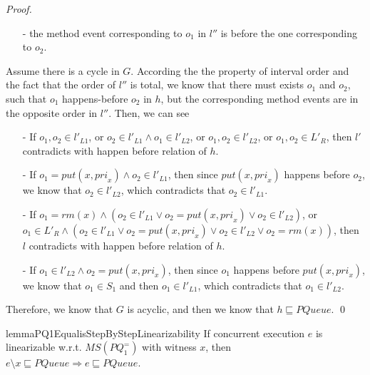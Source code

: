\begin {proof}
\begin{itemize}
\item[-] the method event corresponding to $o_1$ in $l''$ is before the one corresponding to $o_2$.
\end{itemize}

Assume there is a cycle in $G$. According the the property of interval order and the fact that the order of $l''$ is total, we know that there must exists $o_1$ and $o_2$, such that $o_1$ happens-before $o_2$ in $h$, but the corresponding method events are in the opposite order in $l''$. Then, we can see

\begin{itemize}
\setlength{\itemsep}{0.5pt}
\item[-] If $o_1,o_2 \in l'_{L1}$, or $o_2 \in l'_{L1} \wedge o_1 \in l'_{L2}$, or $o_1,o_2 \in l'_{L2}$, or $o_1,o_2 \in L'_R$, then $l'$ contradicts with happen before relation of $h$.

\item[-] If $o_1 = \textit{put}(x,\textit{pri}_x) \wedge o_2 \in l'_{L1}$, then since $\textit{put}(x,\textit{pri}_x)$ happens before $o_2$, we know that $o_2 \in l'_{L2}$, which contradicts that $o_2 \in l'_{L1}$.

\item[-] If $o_1 = \textit{rm}(x) \wedge (o_2 \in  l'_{L1} \vee o_2 = \textit{put}(x,\textit{pri}_x) \vee o_2 \in l'_{L2})$, or $o_1 \in L'_R \wedge ( o_2 \in l'_{L1} \vee o_2 = \textit{put}(x,\textit{pri}_x) \vee o_2 \in l'_{L2} \vee o_2 = \textit{rm}(x) )$, then $l$ contradicts with happen before relation of $h$.

\item[-] If $o_1 \in l'_{L2} \wedge o_2 = \textit{put}(x,\textit{pri}_x)$, then since $o_1$ happens before $\textit{put}(x,\textit{pri}_x)$, we know that $o_1 \in S_1$ and then $o_1 \in l'_{L1}$, which contradicts that $o_1 \in l'_{L2}$.
\end{itemize}

Therefore, we know that $G$ is acyclic, and then we know that $h \sqsubseteq \textit{PQueue}$. \qed
\end {proof}


\begin{restatable}{lemma}{PQ1EqualisStepByStepLinearizability}
\label{lemma:PQ1Equal is step-by-step linearizability}
If concurrent execution $e$ is linearizable w.r.t. $\textit{MS}(\textit{PQ}_1^{=})$ with witness $x$, then $e \setminus x \sqsubseteq \textit{PQueue} \Rightarrow e \sqsubseteq \textit{PQueue}$.
\end{restatable}

